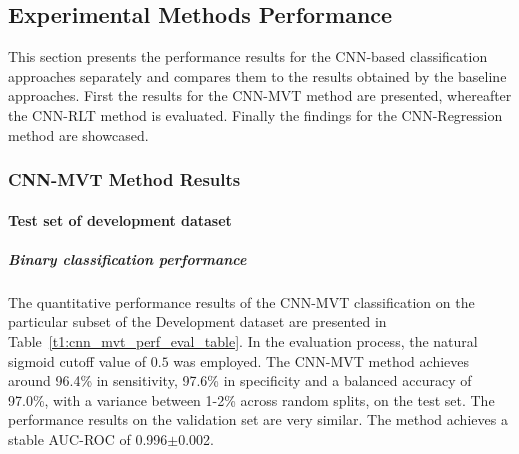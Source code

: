 \subsection{Experimental Methods Performance}
\label{subsec:exp_methods_perf}

This section presents the performance results for the CNN-based classification approaches separately and compares them 
to the results obtained by the baseline approaches.
First the results for the CNN-MVT method are presented, whereafter the CNN-RLT method is evaluated.
Finally the findings for the CNN-Regression method are showcased.

\subsubsection{CNN-MVT Method Results}
\label{subsubsec:eval_mvt}


\paragraph{Test set of development dataset}


\subparagraph{Binary classification performance}

The quantitative performance results of the CNN-MVT classification on the 
particular subset of the Development dataset are presented in Table~\ref{t1:cnn_mvt_perf_eval_table}.
In the evaluation process, the natural sigmoid cutoff value of $0.5$ was employed.
The CNN-MVT method achieves around 96.4\% in sensitivity, 97.6\% in specificity and a balanced accuracy of 97.0\%, 
with a variance between 1-2\% across random splits, on the test set.
The performance results on the validation set are very similar.
The method achieves a stable AUC-ROC of 0.996$\pm$0.002.


